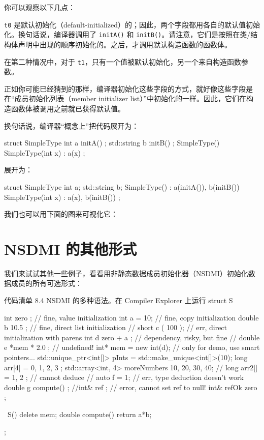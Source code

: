 你可以观察以下几点：

\texttt{t0} 是默认初始化（default-initialized）的；因此，两个字段都用各自的默认值初始化。换句话说，编译器调用了 \texttt{initA()} 和 \texttt{initB()}。请注意，它们是按照在类/结构体声明中出现的顺序初始化的。之后，才调用默认构造函数的函数体。

在第二种情况中，对于 \texttt{t1}，只有一个值被默认初始化，另一个来自构造函数参数。

正如你可能已经猜到的那样，编译器初始化这些字段的方式，就好像这些字段是在“成员初始化列表（member initializer list）”中初始化的一样。因此，它们在构造函数体被调用之前就已获得默认值。

换句话说，编译器“概念上”把代码展开为：

\begin{codebox}[cpp]
struct SimpleType {
    int a { initA() };
    std::string b { initB() };
    SimpleType() { }
    SimpleType(int x) : a(x) { }
};
\end{codebox}

展开为：

\begin{codebox}[cpp]
struct SimpleType {
    int a;
    std::string b;
    SimpleType() : a(initA()), b(initB()) { }
    SimpleType(int x) : a(x), b(initB())
    { }
};
\end{codebox}

我们也可以用下面的图来可视化它：

\section{NSDMI 的其他形式}

我们来试试其他一些例子，看看用非静态数据成员初始化器（NSDMI）初始化数据成员的所有可选形式：


\begin{codeboxt}[cpp]{代码清单 8.4 NSDMI 的多种语法。在 Compiler Explorer 上运行}
struct S {
    int zero {};
    // fine, value initialization
    int a = 10;
    // fine, copy initialization
    double b { 10.5 }; // fine, direct list initialization
    // short c ( 100 );
    // err, direct initialization with parens
    int d { zero + a }; // dependency, risky, but fine
    // double e { *mem * 2.0 }; // undefined!
    int* mem = new int(d); // only for demo, use smart pointers...
    std::unique_ptr<int[]> pInts = std::make_unique<int[]>(10);
    long arr[4] = { 0, 1, 2, 3 };
    std::array<int, 4> moreNumbers { 10, 20, 30, 40};
    // long arr2[] = { 1, 2 }; // cannot deduce
    // auto f = 1;
    // err, type deduction doesn't work
    double g { compute() };
    //int& ref { }; // error, cannot set ref to null!
    int& refOk { zero };

    ~S() { delete mem; }
    double compute() { return a*b; }
};
\end{codeboxt}


